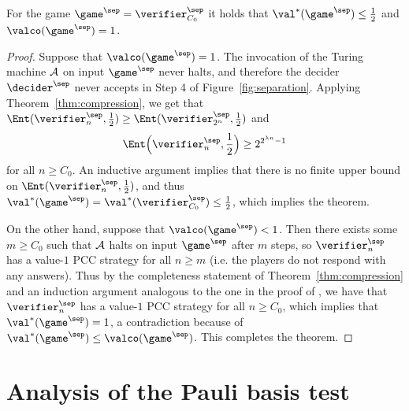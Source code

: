 \begin{theorem}
  \label{thm:separation}
  For the game $\game^\sep = \verifier^\sep_{C_0}$ it holds that
  $\val^*(\game^\sep) \leq \frac{1}{2}$ and $\valco(\game^\sep) = 1$.
\end{theorem}
\begin{proof}
  Suppose that $\valco(\game^\sep) = 1$.
  The invocation of the Turing machine $\cal{A}$ on input $\game^\sep$ never
  halts, and therefore the decider $\decider^\sep$ never accepts in Step 4 of
  Figure~\ref{fig:separation}.
  Applying Theorem~\ref{thm:compression}, we get that
  $\Ent(\verifier^\sep_{n},\frac{1}{2}) \geq
  \Ent(\verifier^\sep_{2^n},\frac{1}{2})$ and
  \begin{equation*}
    \Ent \Bigl( \verifier^\sep_n, \frac{1}{2} \Bigr) \geq 2^{2^{\lambda n}-1}
  \end{equation*}
  for all $n \geq C_0$.
  An inductive argument implies that there is no finite upper bound on
  $\Ent(\verifier^\sep_{n},\frac{1}{2})$, and thus $\val^*(\game^\sep) =
  \val^*(\verifier^\sep_{C_0}) \leq \frac{1}{2}$, which implies the theorem.

  On the other hand, suppose that $\valco(\game^\sep) < 1$.
  Then there exists some $m \geq C_0$ such that $\cal{A}$ halts on input
  $\game^\sep$ after $m$ steps, so $\verifier^\sep_n$ has a value-$1$ PCC
  strategy for all $n \geq m$ (i.e.
  the players do not respond with any answers).
  Thus by the completeness statement of Theorem~\ref{thm:compression} and an
  induction argument analogous to the one in the proof of , we have that $\verifier^\sep_n$ has a value-$1$ PCC
  strategy for all $n \geq C_0$, which implies that $\val^*(\game^\sep) = 1$, a
  contradiction because of $\val^*(\game^\sep) \leq \valco(\game^\sep)$.
  This completes the theorem.
\end{proof}

%
 
\appendix

\newcommand{\ideg}{\mathrm{ideg}}
\newcommand{\Obs}{\mathcal{O}}
\newcommand{\calH}{\mathcal{H}}
\newcommand{\combine}{\mathrm{combine}}
\newcommand{\nqubits}{M}

\section{Analysis of the Pauli basis test}
